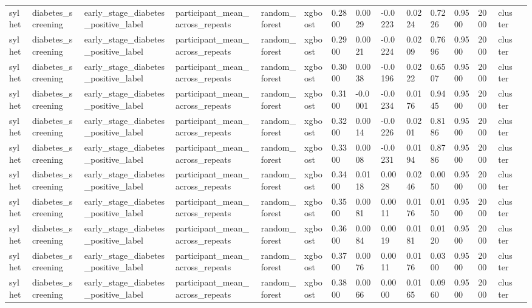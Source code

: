 \begin{tabular}{lllllllllllllll}
sylhet & diabetes\_screening & early\_stage\_diabetes\_positive\_label & participant\_mean\_across\_repeats & random\_forest & xgboost & 0.2800 & 0.0029 & -0.0223 & 0.0224 & 0.7226 & 0.9500 & 2000 & cluster &  \\
sylhet & diabetes\_screening & early\_stage\_diabetes\_positive\_label & participant\_mean\_across\_repeats & random\_forest & xgboost & 0.2900 & 0.0021 & -0.0224 & 0.0209 & 0.7696 & 0.9500 & 2000 & cluster &  \\
sylhet & diabetes\_screening & early\_stage\_diabetes\_positive\_label & participant\_mean\_across\_repeats & random\_forest & xgboost & 0.3000 & 0.0038 & -0.0196 & 0.0222 & 0.6507 & 0.9500 & 2000 & cluster &  \\
sylhet & diabetes\_screening & early\_stage\_diabetes\_positive\_label & participant\_mean\_across\_repeats & random\_forest & xgboost & 0.3100 & -0.0001 & -0.0234 & 0.0176 & 0.9445 & 0.9500 & 2000 & cluster &  \\
sylhet & diabetes\_screening & early\_stage\_diabetes\_positive\_label & participant\_mean\_across\_repeats & random\_forest & xgboost & 0.3200 & 0.0014 & -0.0226 & 0.0201 & 0.8186 & 0.9500 & 2000 & cluster &  \\
sylhet & diabetes\_screening & early\_stage\_diabetes\_positive\_label & participant\_mean\_across\_repeats & random\_forest & xgboost & 0.3300 & 0.0008 & -0.0231 & 0.0194 & 0.8786 & 0.9500 & 2000 & cluster &  \\
sylhet & diabetes\_screening & early\_stage\_diabetes\_positive\_label & participant\_mean\_across\_repeats & random\_forest & xgboost & 0.3400 & 0.0118 & 0.0028 & 0.0246 & 0.0050 & 0.9500 & 2000 & cluster &  \\
sylhet & diabetes\_screening & early\_stage\_diabetes\_positive\_label & participant\_mean\_across\_repeats & random\_forest & xgboost & 0.3500 & 0.0081 & 0.0011 & 0.0176 & 0.0150 & 0.9500 & 2000 & cluster &  \\
sylhet & diabetes\_screening & early\_stage\_diabetes\_positive\_label & participant\_mean\_across\_repeats & random\_forest & xgboost & 0.3600 & 0.0084 & 0.0019 & 0.0181 & 0.0120 & 0.9500 & 2000 & cluster &  \\
sylhet & diabetes\_screening & early\_stage\_diabetes\_positive\_label & participant\_mean\_across\_repeats & random\_forest & xgboost & 0.3700 & 0.0076 & 0.0011 & 0.0176 & 0.0300 & 0.9500 & 2000 & cluster &  \\
sylhet & diabetes\_screening & early\_stage\_diabetes\_positive\_label & participant\_mean\_across\_repeats & random\_forest & xgboost & 0.3800 & 0.0066 & 0.0000 & 0.0165 & 0.0960 & 0.9500 & 2000 & cluster &  \\

\end{tabular}
